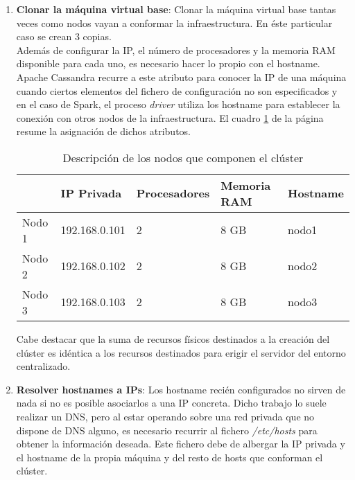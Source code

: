 \begin{enumerate}
	
\item \textbf{Clonar la máquina virtual base}: Clonar la máquina virtual base tantas veces como nodos vayan a conformar la infraestructura. En éste particular caso se crean 3 copias.\\

Además de configurar la IP, el número de procesadores y la memoria RAM disponible para cada uno, es necesario hacer lo propio con el hostname. Apache Cassandra recurre a este atributo para conocer la IP de una máquina cuando ciertos elementos del fichero de configuración no son especificados y en el caso de Spark, el proceso \textit{driver} utiliza los hostname para establecer la conexión con otros nodos de la infraestructura. El cuadro \ref{nodos-cluster} de la página \pageref{nodos-cluster} resume la asignación de dichos atributos.\\

\begin{table}[h!]
	\centering
	\begin{tabular}{|l||l|l|l|l|}
		
		\hline
		
		& \textbf{IP Privada} & \textbf{Procesadores} & \textbf{Memoria RAM} & \textbf{Hostname} \\
		
		\hline
		\hline
		
		Nodo 1 & 192.168.0.101 & 2 & 8 GB & nodo1 \\
		
		\hline
		
		Nodo 2 & 192.168.0.102 & 2 & 8 GB & nodo2 \\
		
		\hline
		
		Nodo 3 & 192.168.0.103 & 2 & 8 GB & nodo3 \\
		
		\hline
		
	\end{tabular}
	\caption{Descripción de los nodos que componen el clúster}
	\label{nodos-cluster}
\end{table}

Cabe destacar que la suma de recursos físicos destinados a la creación del clúster es idéntica a los recursos destinados para erigir el servidor del entorno centralizado.

\item \textbf{Resolver hostnames a IPs}: Los hostname recién configurados no sirven de nada si no es posible asociarlos a una IP concreta. Dicho trabajo lo suele realizar un DNS, pero al estar operando sobre una red privada que no dispone de DNS alguno, es necesario recurrir al fichero \textit{/etc/hosts} para obtener la información deseada. Este fichero debe de albergar la IP privada y el hostname de la propia máquina y del resto de hosts que conforman el clúster.


\end{enumerate}
